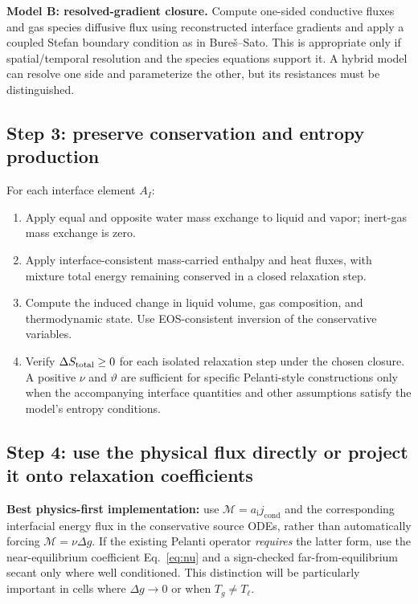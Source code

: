 \documentclass[11pt,letterpaper]{article}
\newcommand{\mi}{\mathrm{i}}
\newcommand{\area}{a_\mi}
\newcommand{\jcond}{j_{\mathrm{cond}}}
\newcommand{\mcal}{\mathcal{M}}
\begin{document}
\textbf{Model B: resolved-gradient closure.} Compute one-sided conductive fluxes and gas species diffusive flux using reconstructed interface gradients and apply a coupled Stefan boundary condition as in Bure\v{s}--Sato. This is appropriate only if spatial/temporal resolution and the species equations support it. A hybrid model can resolve one side and parameterize the other, but its resistances must be distinguished.

\subsection{Step 3: preserve conservation and entropy production}
For each interface element $A_I$:
\begin{enumerate}
\item Apply equal and opposite water mass exchange to liquid and vapor; inert-gas mass exchange is zero.
\item Apply interface-consistent mass-carried enthalpy and heat fluxes, with mixture total energy remaining conserved in a closed relaxation step.
\item Compute the induced change in liquid volume, gas composition, and thermodynamic state. Use EOS-consistent inversion of the conservative variables.
\item Verify $\Delta S_{\rm total}\ge0$ for each isolated relaxation step under the chosen closure. A positive $\nu$ and $\vartheta$ are sufficient for specific Pelanti-style constructions only when the accompanying interface quantities and other assumptions satisfy the model's entropy conditions.
\end{enumerate}

\subsection{Step 4: use the physical flux directly or project it onto relaxation coefficients}
\textbf{Best physics-first implementation:} use $\mcal=\area\jcond$ and the corresponding interfacial energy flux in the conservative source ODEs, rather than automatically forcing $\mcal=\nu\Delta g$. If the existing Pelanti operator \emph{requires} the latter form, use the near-equilibrium coefficient Eq.~\eqref{eq:nu} and a sign-checked far-from-equilibrium secant only where well conditioned. This distinction will be particularly important in cells where $\Delta g\to0$ or when $T_g\ne T_\ell$.
\end{document}
